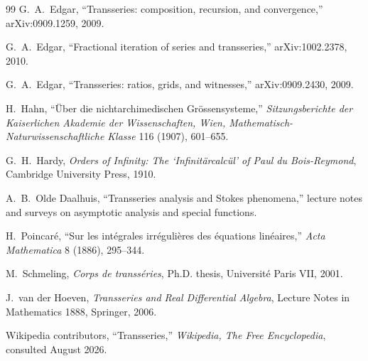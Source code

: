 \documentclass[11pt,oneside,openany]{book}
\theoremstyle{plain}
\theoremstyle{definition}
\theoremstyle{remark}
\begin{document}
\begin{thebibliography}{99}
G.~A.~Edgar,
``Transseries: composition, recursion, and convergence,''
arXiv:0909.1259, 2009.

G.~A.~Edgar,
``Fractional iteration of series and transseries,''
arXiv:1002.2378, 2010.

G.~A.~Edgar,
``Transseries: ratios, grids, and witnesses,''
arXiv:0909.2430, 2009.

H.~Hahn,
``Über die nichtarchimedischen Grössensysteme,''
\emph{Sitzungsberichte der Kaiserlichen Akademie der Wissenschaften, Wien,
Mathematisch-Naturwissenschaftliche Klasse} 116 (1907), 601--655.

G.~H.~Hardy,
\emph{Orders of Infinity: The `Infinitärcalcül' of Paul du Bois-Reymond},
Cambridge University Press, 1910.

A.~B.~Olde Daalhuis,
``Transseries analysis and Stokes phenomena,''
lecture notes and surveys on asymptotic analysis and special functions.

H.~Poincaré,
``Sur les intégrales irrégulières des équations linéaires,''
\emph{Acta Mathematica} 8 (1886), 295--344.

M.~Schmeling,
\emph{Corps de transséries},
Ph.D. thesis, Université Paris VII, 2001.

J.~van der Hoeven,
\emph{Transseries and Real Differential Algebra},
Lecture Notes in Mathematics 1888, Springer, 2006.

Wikipedia contributors,
``Transseries,''
\emph{Wikipedia, The Free Encyclopedia},
consulted August 2026.

\end{thebibliography}
\end{document}
